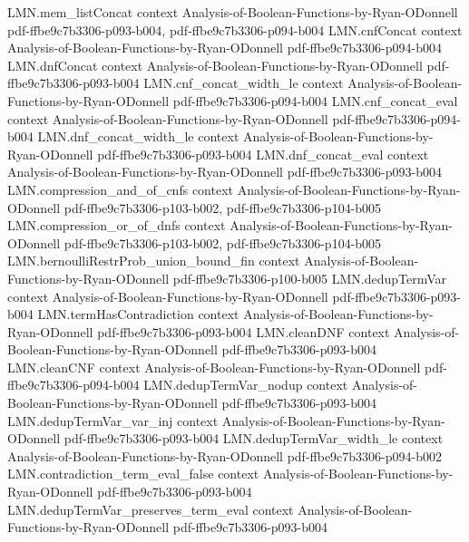 \begin{lemma}
\proofstep
  {LMN.mem_listConcat}
  {context}
  {Analysis-of-Boolean-Functions-by-Ryan-ODonnell}
  {pdf-ffbe9c7b3306-p093-b004,
    pdf-ffbe9c7b3306-p094-b004}
\proofstep
  {LMN.cnfConcat}
  {context}
  {Analysis-of-Boolean-Functions-by-Ryan-ODonnell}
  {pdf-ffbe9c7b3306-p094-b004}
\proofstep
  {LMN.dnfConcat}
  {context}
  {Analysis-of-Boolean-Functions-by-Ryan-ODonnell}
  {pdf-ffbe9c7b3306-p093-b004}
\proofstep
  {LMN.cnf_concat_width_le}
  {context}
  {Analysis-of-Boolean-Functions-by-Ryan-ODonnell}
  {pdf-ffbe9c7b3306-p094-b004}
\proofstep
  {LMN.cnf_concat_eval}
  {context}
  {Analysis-of-Boolean-Functions-by-Ryan-ODonnell}
  {pdf-ffbe9c7b3306-p094-b004}
\proofstep
  {LMN.dnf_concat_width_le}
  {context}
  {Analysis-of-Boolean-Functions-by-Ryan-ODonnell}
  {pdf-ffbe9c7b3306-p093-b004}
\proofstep
  {LMN.dnf_concat_eval}
  {context}
  {Analysis-of-Boolean-Functions-by-Ryan-ODonnell}
  {pdf-ffbe9c7b3306-p093-b004}
\proofstep
  {LMN.compression_and_of_cnfs}
  {context}
  {Analysis-of-Boolean-Functions-by-Ryan-ODonnell}
  {pdf-ffbe9c7b3306-p103-b002,
    pdf-ffbe9c7b3306-p104-b005}
\proofstep
  {LMN.compression_or_of_dnfs}
  {context}
  {Analysis-of-Boolean-Functions-by-Ryan-ODonnell}
  {pdf-ffbe9c7b3306-p103-b002,
    pdf-ffbe9c7b3306-p104-b005}
\proofstep
  {LMN.bernoulliRestrProb_union_bound_fin}
  {context}
  {Analysis-of-Boolean-Functions-by-Ryan-ODonnell}
  {pdf-ffbe9c7b3306-p100-b005}
\proofstep
  {LMN.dedupTermVar}
  {context}
  {Analysis-of-Boolean-Functions-by-Ryan-ODonnell}
  {pdf-ffbe9c7b3306-p093-b004}
\proofstep
  {LMN.termHasContradiction}
  {context}
  {Analysis-of-Boolean-Functions-by-Ryan-ODonnell}
  {pdf-ffbe9c7b3306-p093-b004}
\proofstep
  {LMN.cleanDNF}
  {context}
  {Analysis-of-Boolean-Functions-by-Ryan-ODonnell}
  {pdf-ffbe9c7b3306-p093-b004}
\proofstep
  {LMN.cleanCNF}
  {context}
  {Analysis-of-Boolean-Functions-by-Ryan-ODonnell}
  {pdf-ffbe9c7b3306-p094-b004}
\proofstep
  {LMN.dedupTermVar_nodup}
  {context}
  {Analysis-of-Boolean-Functions-by-Ryan-ODonnell}
  {pdf-ffbe9c7b3306-p093-b004}
\proofstep
  {LMN.dedupTermVar_var_inj}
  {context}
  {Analysis-of-Boolean-Functions-by-Ryan-ODonnell}
  {pdf-ffbe9c7b3306-p093-b004}
\proofstep
  {LMN.dedupTermVar_width_le}
  {context}
  {Analysis-of-Boolean-Functions-by-Ryan-ODonnell}
  {pdf-ffbe9c7b3306-p094-b002}
\proofstep
  {LMN.contradiction_term_eval_false}
  {context}
  {Analysis-of-Boolean-Functions-by-Ryan-ODonnell}
  {pdf-ffbe9c7b3306-p093-b004}
\proofstep
  {LMN.dedupTermVar_preserves_term_eval}
  {context}
  {Analysis-of-Boolean-Functions-by-Ryan-ODonnell}
  {pdf-ffbe9c7b3306-p093-b004}

\end{lemma}
